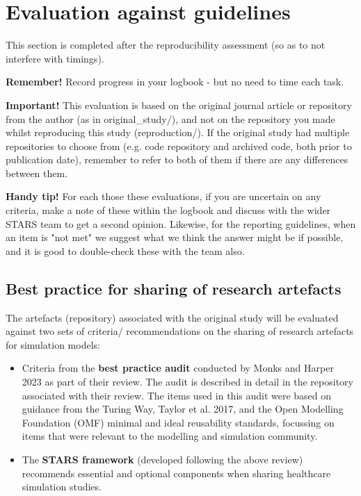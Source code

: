 \section{Evaluation against guidelines}

This section is completed after the reproducibility assessment (so as to not interfere with timings).

\textbf{Remember!} Record progress in your logbook - but no need to time each task.

\textbf{Important!} This evaluation is based on the original journal article or repository from the author (as in original\_study/), and not on the repository you made whilst reproducing this study (reproduction/). If the original study had multiple repositories to choose from (e.g. code repository and archived code, both prior to publication date), remember to refer to both of them if there are any differences between them.

\textbf{Handy tip!} For each those these evaluations, if you are uncertain on any criteria, make a note of these within the logbook and discuss with the wider STARS team to get a second opinion. Likewise, for the reporting guidelines, when an item is "not met" we suggest what we think the answer might be if possible, and it is good to double-check these with the team also.

\vspace{0.5cm}
\subsection{Best practice for sharing of research artefacts}

The artefacts (repository) associated with the original study will be evaluated against two sets of criteria/ recommendations on the sharing of research artefacts for simulation models:
\begin{itemize}
    \item Criteria from the \textbf{best practice audit} conducted by Monks and Harper 2023\autocite{monks_computer_2023} as part of their review. The audit is described in detail in the repository associated with their review.\autocite{monks_computer_2024} The items used in this audit were based on guidance from the Turing Way,\autocite{the_turing_way_community_turing_2022} Taylor et al. 2017,\autocite{taylor_open_2017} and the Open Modelling Foundation (OMF) minimal and ideal reusability standards,\autocite{the_open_modeling_foundation_omf_reusability_2024} focussing on items that were relevant to the modelling and simulation community.
    \item The \textbf{STARS framework} (developed following the above review) recommends essential and optional components when sharing healthcare simulation studies.
\end{itemize}

